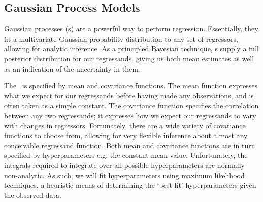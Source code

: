 \documentclass[journal]{IEEEtran}
\begin{document}


\subsection{Gaussian Process Models\label{sec:ngpm}}

Gaussian processes (\gp s) \cite{GPsBook} are a powerful way to perform regression. Essentially, they fit a multivariate Gaussian probability distribution to any set of regressors, allowing for analytic inference. As a principled Bayesian technique, \gp s supply a full posterior distribution for our regressands, giving us both mean estimates as well as an indication of the uncertainty in them.  

The \gp\ is specified by mean and covariance functions. The mean function expresses what we expect for our regressands before having made any observations, and is often taken as a simple constant. The covariance function specifies the correlation between any two regressands; it expresses how we expect our regressands to vary with changes in regressors. Fortunately, there are a wide variety of covariance functions to choose from, allowing for very flexible inference about almost any conceivable regressand function. Both mean and covariance functions are in turn specified by hyperparameters e.g. the constant mean value. Unfortunately, the integrals required to integrate over all possible hyperparameters are normally non-analytic. As such, we will fit hyperparameters using maximum likelihood techniques, a heuristic means of determining the `best fit' hyperparameters given the observed data.  
\end{document}
